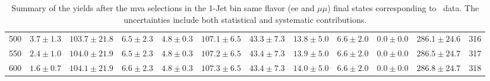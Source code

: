 \begin{table}[!ht]
{\begin{center}
\begin{tabular}{l c c c c c c c c c c c }
500 & $3.7\pm1.3$ & $103.7\pm21.8$ & $6.5\pm2.3$ & $4.8\pm0.3$ & $107.1\pm6.5$ & $43.3\pm7.3$ & $13.8\pm5.0$ & $6.6\pm2.0$ & $0.0\pm0.0$ & $286.1\pm24.6$ & 316 \\
550 & $2.4\pm1.0$ & $104.0\pm21.9$ & $6.5\pm2.3$ & $4.8\pm0.3$ & $107.2\pm6.5$ & $43.4\pm7.3$ & $13.9\pm5.0$ & $6.6\pm2.0$ & $0.0\pm0.0$ & $286.5\pm24.7$ & 317 \\
600 & $1.6\pm0.7$ & $104.1\pm21.9$ & $6.6\pm2.3$ & $4.8\pm0.3$ & $107.3\pm6.5$ & $43.4\pm7.3$ & $14.0\pm5.0$ & $6.6\pm2.0$ & $0.0\pm0.0$ & $286.8\pm24.7$ & 318 \\
\hline
\end{tabular}
\end{center}
}
\caption{Summary of the yields after the mva selections in the 1-Jet bin same flavor (ee and $\mu\mu$) final states corresponding to \intlumi\ data. The uncertainties include 
both statistical and systematic contributions. }
\end{table}

\clearpage

